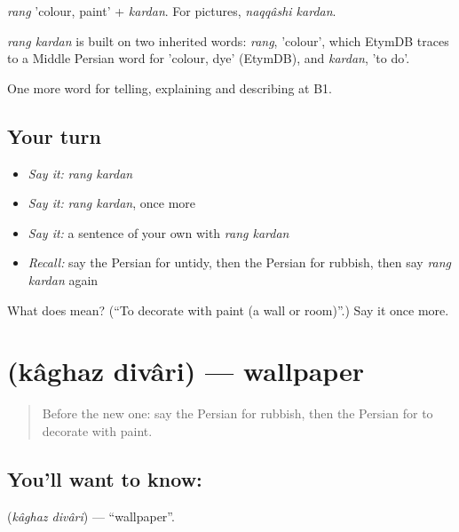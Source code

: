\emph{rang} 'colour, paint' + \emph{kardan}. For pictures, \emph{naqqâshi kardan}.

\begin{cousinweb}
\emph{rang kardan} is built on two inherited words: \emph{rang}, 'colour', which EtymDB traces to a Middle Persian word for 'colour, dye' (EtymDB), and \emph{kardan}, 'to do'.
\end{cousinweb}

\begin{grammarlens}[title={What you've built}]
One more word for telling, explaining and describing at B1.
\end{grammarlens}

\subsection*{Your turn}
\begin{itemize}
\raggedright
  \item \emph{Say it:} \emph{rang kardan}
  \item \emph{Say it:} \emph{rang kardan}, once more
  \item \emph{Say it:} a sentence of your own with \emph{rang kardan}
  \item \emph{Recall:} say the Persian for untidy, then the Persian for rubbish, then say \emph{rang kardan} again
\end{itemize}

\begin{tcolorbox}[breakable,colback=teal!4,colframe=teal!35!black,title={Before you move on}]
What does   mean? (\textquotedblleft{}To decorate with paint (a wall or room)\textquotedblright{}.) Say it once more.
\end{tcolorbox}
\section[\texorpdfstring{\fa{کاغذ} \fa{دیواری} (kâghaz divâri)}{کاغذ دیواری (kâghaz divâri)}]{  (kâghaz divâri) — wallpaper}

\label{lesson:FA-C537-kaghaz-divari}



\begin{quote}
Before the new one: say the Persian for rubbish, then the Persian for to decorate with paint.
\end{quote}

\subsection*{You'll want to know:  }
\textbf{ } (\emph{kâghaz divâri}) — \textquotedblleft{}wallpaper\textquotedblright{}.

